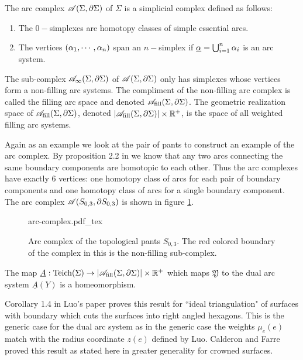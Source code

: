 \begin{definition}
  The arc complex $ \mathscr{A}(\Sigma, \partial \Sigma)$ of $\Sigma$ is a simplicial complex defined as follows:
  \begin{enumerate}
    \item The $0-$simplexes are homotopy classes of simple essential arcs.
    \item The vertices $(\alpha_1,\cdots, \alpha_n)$ span an $n-$simplex if $\underline{\alpha} = \bigcup_{i=1}^n \alpha_i$ is an arc system.
  \end{enumerate}
  The sub-complex $ \mathscr{A}_\infty(\Sigma, \partial \Sigma)$ of $ \mathscr{A}(\Sigma, \partial \Sigma)$ only has simplexes whose vertices form a non-filling arc systems. The compliment of the non-filling arc complex is called the filling arc space and denoted $ \mathscr{A}_{\text{fill}}(\Sigma, \partial \Sigma)$. The geometric realization space of $\mathscr{A}_{\text{fill}}(\Sigma, \partial \Sigma)$, denoted $|\mathscr{A}_{\text{fill}}(\Sigma, \partial \Sigma)|\times \mathbb{R}^+$, is the space of all weighted filling arc systems.
\end{definition}
\begin{exmp}
  Again as an example we look at the pair of pants to construct an example of the arc complex. By proposition 2.2 in \cite{primer} we know that any two arcs connecting the same boundary components are homotopic to each other. Thus the arc complexes have exactly $6$ vertices: one homotopy class of arcs for each pair of boundary components and one homotopy class of arcs for a single boundary component. The arc complex $ \mathscr{A}(S_{0,3}, \partial S_{0,3})$ is shown in figure \ref{fig:pants-arc-complex}.
\end{exmp}
\begin{figure}[h]
\centering
\def\svgwidth{0.5\textwidth}
{arc-complex.pdf_tex}
\caption[Arc complex of a Pants]{Arc complex of the topological pants $S_{0,3}$. The red colored boundary of the complex in this is the non-filling sub-complex.}
\label{fig:pants-arc-complex}
\end{figure}

\begin{theorem}
  The map $\underline{A}:\text{Teich}(\Sigma)\to |\mathscr{A}_{\text{fill}}(\Sigma, \partial \Sigma)|\times \mathbb{R}^+$ which maps $ \mathfrak{Y}$ to the dual arc system $\underline{A}(Y)$ is a homeomorphism. 
\end{theorem}
\begin{rem}
Corollary 1.4 in Luo's paper proves this result for ``ideal triangulation" of surfaces with boundary which cuts the surfaces into right angled hexagons. This is the generic case for the dual arc system as in the generic case the weights $\mu_e(e)$ match with the radius coordinate $z(e)$ defined by Luo. Calderon and Farre proved this result as stated here in greater generality for crowned surfaces. 
\end{rem}
